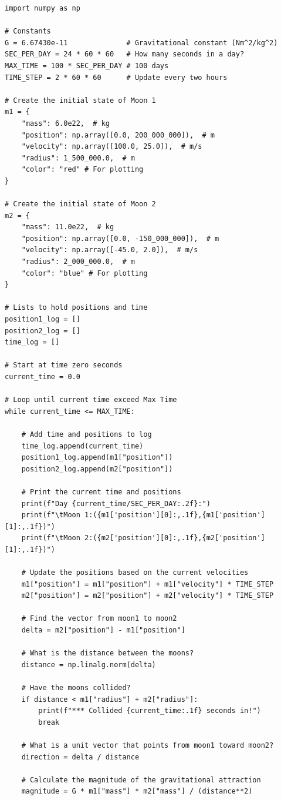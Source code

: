 \begin{verbatim}
import numpy as np

# Constants
G = 6.67430e-11              # Gravitational constant (Nm^2/kg^2)
SEC_PER_DAY = 24 * 60 * 60   # How many seconds in a day?
MAX_TIME = 100 * SEC_PER_DAY # 100 days
TIME_STEP = 2 * 60 * 60      # Update every two hours

# Create the initial state of Moon 1
m1 = {
    "mass": 6.0e22,  # kg
    "position": np.array([0.0, 200_000_000]),  # m
    "velocity": np.array([100.0, 25.0]),  # m/s
    "radius": 1_500_000.0,  # m
    "color": "red" # For plotting
}

# Create the initial state of Moon 2
m2 = {
    "mass": 11.0e22,  # kg
    "position": np.array([0.0, -150_000_000]),  # m
    "velocity": np.array([-45.0, 2.0]),  # m/s
    "radius": 2_000_000.0,  # m
    "color": "blue" # For plotting
}  

# Lists to hold positions and time
position1_log = []
position2_log = []
time_log = []

# Start at time zero seconds
current_time = 0.0

# Loop until current time exceed Max Time
while current_time <= MAX_TIME:

    # Add time and positions to log
    time_log.append(current_time)
    position1_log.append(m1["position"])
    position2_log.append(m2["position"])
    
    # Print the current time and positions
    print(f"Day {current_time/SEC_PER_DAY:.2f}:")
    print(f"\tMoon 1:({m1['position'][0]:,.1f},{m1['position'][1]:,.1f})")
    print(f"\tMoon 2:({m2['position'][0]:,.1f},{m2['position'][1]:,.1f})")

    # Update the positions based on the current velocities
    m1["position"] = m1["position"] + m1["velocity"] * TIME_STEP
    m2["position"] = m2["position"] + m2["velocity"] * TIME_STEP

    # Find the vector from moon1 to moon2
    delta = m2["position"] - m1["position"]

    # What is the distance between the moons?
    distance = np.linalg.norm(delta)

    # Have the moons collided?
    if distance < m1["radius"] + m2["radius"]:
        print(f"*** Collided {current_time:.1f} seconds in!")
        break

    # What is a unit vector that points from moon1 toward moon2?
    direction = delta / distance

    # Calculate the magnitude of the gravitational attraction
    magnitude = G * m1["mass"] * m2["mass"] / (distance**2)


\end{verbatim}
